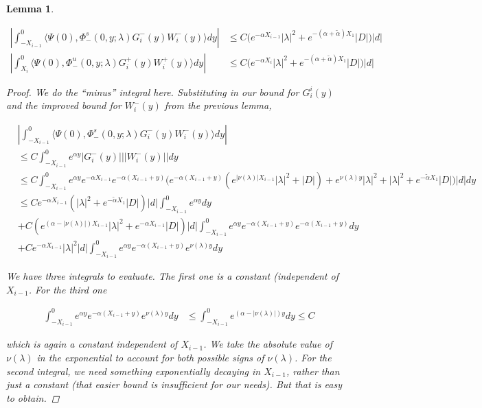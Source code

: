 \documentclass[12pt]{article}
\newtheorem{lemma}{Lemma}
\begin{document}
\begin{lemma}\label{noncenterW}

\begin{align*}
\left| \int_{-X_{i-1}}^0 \langle \Psi(0), \Phi^s_-(0, y; \lambda) G_i^-(y) W_i^-(y) \rangle dy \right| &\leq C \Big( e^{-\alpha X_{i-1}} |\lambda|^2 + e^{-(\alpha + \tilde{\alpha}) X_1} |D| \Big) |d| \\
\left| \int_{X_i}^0 \langle \Psi(0), \Phi^u_-(0, y; \lambda) G_i^+(y) W_i^+(y) \rangle dy \right| &\leq C \Big( e^{-\alpha X_i} |\lambda|^2 + e^{-(\alpha + \tilde{\alpha}) X_1} |D| \Big) |d|
\end{align*}

\begin{proof}

We do the ``minus'' integral here. Substituting in our bound for $G_i^i(y)$ and the improved bound for $W_i^-(y)$ from the previous lemma,

\begin{align*}
&\left| \int_{-X_{i-1}}^0 \langle \Psi(0), \Phi^s_-(0, y; \lambda) G_i^-(y) W_i^-(y) \rangle dy \right| \\
&\leq C \int_{-X_{i-1}}^0 e^{\alpha y} |G_i^-(y)| ||W_i^-(y)|| dy \\
&\leq C \int_{-X_{i-1}}^0 e^{\alpha y} e^{-\alpha X_{i-1}} e^{-\alpha(X_{i-1} + y)} \Big(e^{-\alpha(X_{i-1} + y)}( e^{|\nu(\lambda)| X_{i-1}} |\lambda|^2 + |D|) + e^{\nu(\lambda)y} |\lambda|^2 
+ |\lambda|^2 + e^{-\tilde{\alpha} X_1} |D| \Big) |d| dy \\
&\leq C e^{-\alpha X_{i-1}} (|\lambda|^2 + e^{-\tilde{\alpha} X_1} |D| ) |d| \int_{-X_{i-1}}^0 e^{\alpha y} dy \\
&+ C ( e^{(\alpha - |\nu(\lambda)|) X_{i-1}} |\lambda|^2 + e^{-\alpha X_{i-1}} |D|)|d|\int_{-X_{i-1}}^0 e^{\alpha y} e^{-\alpha(X_{i-1} + y)} e^{-\alpha(X_{i-1} + y)} dy \\
&+ C e^{-\alpha X_{i-1}} |\lambda|^2 |d| \int_{-X_{i-1}}^0 e^{\alpha y} e^{-\alpha(X_{i-1} + y)} e^{\nu(\lambda)y} dy
\end{align*}

We have three integrals to evaluate. The first one is a constant (independent of $X_{i-1}$. For the third one

\begin{align*}
\int_{-X_{i-1}}^0 e^{\alpha y} e^{-\alpha(X_{i-1} + y)} e^{\nu(\lambda)y} dy 
&\leq \int_{-X_{i-1}}^0 e^{(\alpha - |\nu(\lambda)|) y} dy \leq C
\end{align*}

which is again a constant independent of $X_{i-1}$. We take the absolute value of $\nu(\lambda)$ in the exponential to account for both possible signs of $\nu(\lambda)$. For the second integral, we need something exponentially decaying in $X_{i-1}$, rather than just a constant (that easier bound is insufficient for our needs). But that is easy to obtain.


\end{proof}
\end{lemma}
\end{document}
